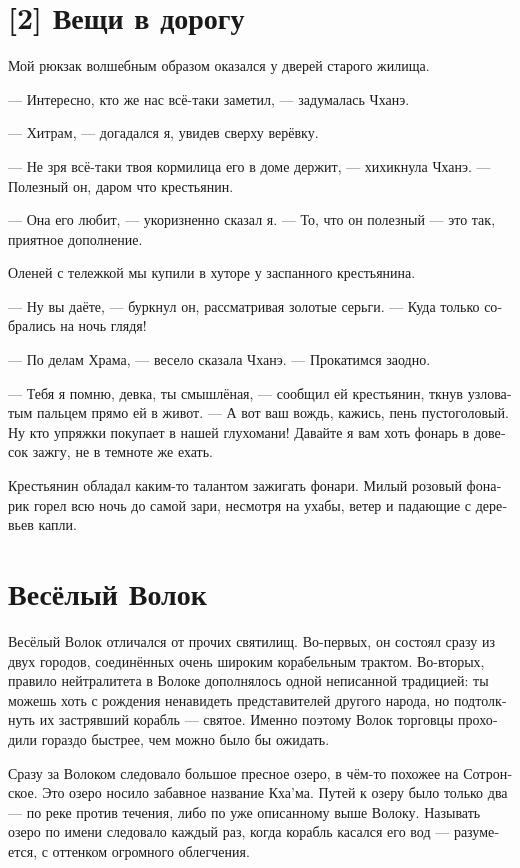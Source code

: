 \documentclass[a4paper,12pt,fleqn]{book}\usepackage{cooltooltips}\usepackage{polyglossia}\setdefaultlanguage[babelshorthands=true]{russian}\setotherlanguage{english}\defaultfontfeatures{Ligatures=TeX,Mapping=tex-text} \usepackage{xcolor}\definecolor{lightgray}{HTML}{bbbbbb}\color{lightgray}\newcommand{\ml}[3]{\textenglish{\textcolor{black}{#3}}}
\newcommand{\asterism}{\vspace{1em}{\centering\Large\bfseries$\ast~\ast~\ast$\par}\vspace{1em}}
\newcommand{\FM}{\footnotemark}
\newcommand{\FA}[1]{\footnotetext{#1 \emph{\ml{$0$}{---~Прим.~авт.}{---~Author.}}}}
\begin{document}
{\section{[2] Вещи в дорогу}

Мой рюкзак волшебным образом оказался у дверей старого жилища.

--- Интересно, кто же нас всё-таки заметил, --- задумалась Чханэ.

--- Хитрам, --- догадался я, увидев сверху верёвку.

--- Не зря всё-таки твоя кормилица его в доме держит, --- хихикнула Чханэ.
--- Полезный он, даром что крестьянин.

--- Она его любит, --- укоризненно сказал я.
--- То, что он полезный --- это так, приятное дополнение.

\asterism

Оленей с тележкой мы купили в хуторе у заспанного крестьянина.

--- Ну вы даёте, --- буркнул он, рассматривая золотые серьги.
--- Куда только собрались на ночь глядя!

--- По делам Храма, --- весело сказала Чханэ.
--- Прокатимся заодно.

--- Тебя я помню, девка, ты смышлёная, --- сообщил ей крестьянин, ткнув узловатым пальцем прямо ей в живот.
--- А вот ваш вождь, кажись, пень пустоголовый.
Ну кто упряжки покупает в нашей глухомани!
Давайте я вам хоть фонарь в довесок зажгу, не в темноте же ехать.

Крестьянин обладал каким-то талантом зажигать фонари.
Милый розовый фонарик горел всю ночь до самой зари, несмотря на ухабы, ветер и падающие с деревьев капли.

\section{Весёлый Волок}

Весёлый Волок отличался от прочих святилищ.
Во-первых, он состоял сразу из двух городов, соединённых очень широким корабельным трактом.
Во-вторых, правило нейтралитета в Волоке дополнялось одной неписанной традицией: ты можешь хоть с рождения ненавидеть представителей другого народа, но подтолкнуть их застрявший корабль --- святое.
Именно поэтому Волок торговцы проходили гораздо быстрее, чем можно было бы ожидать.

Сразу за Волоком следовало большое пресное озеро, в чём-то похожее на Сотронское.
Это озеро носило забавное название Кха'ма\FM.
\FA{
Наконец-то! добрались! (цатрон).
}
Путей к озеру было только два --- по реке против течения, либо по уже описанному выше Волоку.
Называть озеро по имени следовало каждый раз, когда корабль касался его вод --- разумеется, с оттенком огромного облегчения.

}
\end{document}
